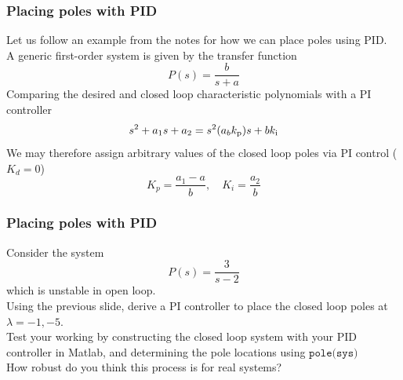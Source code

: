 \documentclass[9pt]{beamer-control}
\begin{document}
\begin{frame}[fragile]
	\frametitle{Placing poles with PID}
	Let us follow an example from the notes for how we can place poles using PID.\\
	A generic first-order system is given by the transfer function 
	\begin{equation}
		P(s) = \frac{b}{s+a}
	\end{equation}
	Comparing the desired and closed loop characteristic polynomials with a PI controller
	\begin{equation}
		s^2+a_1s+a_2 = s^2 (a_bk_{\mathrm{p}})s+bk_{\mathrm{i}}
	\end{equation}
	We may therefore assign arbitrary values of the closed loop poles via PI control ($K_d=0$)
	\begin{equation}
		K_p=\frac{a_1-a}{b}, \quad K_i = \frac{a_2}{b}
	\end{equation}
\end{frame}


\begin{frame}[fragile]
	\frametitle{Placing poles with PID}
	Consider the system
	\begin{equation}
		P(s) = \frac{3}{s-2}
	\end{equation}
	which is unstable in open loop.\\[10pt]
	
	Using the previous slide, derive a PI controller to place the closed loop poles at $\lambda = -1, -5$. \\[10pt]
	
	Test your working by constructing the closed loop system with your PID controller in Matlab, and determining the pole locations using  $\texttt{pole(sys)}$ \\[10pt]
	
	\alert{How robust do you think this process is for real systems?}
\end{frame}
\end{document}
